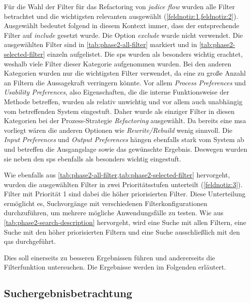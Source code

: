 

Für die Wahl der Filter für das Refactoring von \emph{jadice flow} wurden alle Filter betrachtet und die wichtigsten relevanten ausgewählt (\cref{feldnotiz:1,feldnotiz:2}).
Ausgewählt bedeutet folgend in diesem Kontext immer, dass der entsprechende Filter auf \emph{include} gesetzt wurde.
Die Option \emph{exclude} wurde nicht verwendet.
Die ausgewählten Filter sind in \cref{tab:phase2-all-filter} markiert und in \cref{tab:phase2-selected-filter} einzeln aufgelistet.
Die \glspl{sp} wurden als besonders wichtig erachtet, weshalb viele Filter dieser Kategorie aufgenommen wurden.
Bei den anderen Kategorien wurden nur die wichtigsten Filter verwendet, da eine zu große Anzahl an Filtern die Aussagekraft verringern könnte.
Vor allem \emph{Process Preferences} und \emph{Usability Preferences}, also Eigenschaften, die die interne Funktionsweise der Methode betreffen, wurden als relativ unwichtig und vor allem auch unabhängig vom betreffenden System eingestuft.
Daher wurde als einziger Filter in diesen Kategorien bei der Prozess-Strategie \emph{Refactoring} ausgewählt.
Da bereits eine \gls{msa} vorliegt wären die anderen Optionen wie \emph{Rewrite/Rebuild} wenig sinnvoll.
Die \emph{Input Preferences} und \emph{Output Preferences} hängen ebenfalls stark vom System ab und betreffen die Ausgangslage sowie das gewünschte Ergebnis.
Deswegen wurden sie neben den \glspl{sp} ebenfalls als besonders wichtig eingestuft. 



Wie ebenfalls aus \cref{tab:phase2-all-filter,tab:phase2-selected-filter} hervorgeht, wurden die ausgewählten Filter in zwei Prioritätsstufen unterteilt (\cref{feldnotiz:3}).
Filter mit Priorität 1 sind dabei die höher priorisierten Filter.
Diese Unterteilung ermöglicht es, Suchvorgänge mit verschiedenen Filterkonfigurationen durchzuführen, um mehrere mögliche Anwendungsfälle zu testen.
Wie aus \cref{tab:phase2-search-description} hervorgeht, wird eine Suche mit allen Filtern, eine Suche mit den höher priorisierten Filtern und eine Suche ausschließlich mit den \glspl{qa} durchgeführt.

Dies soll einerseits zu besseren Ergebnissen führen und andererseits die Filterfunktion untersuchen. 
Die Ergebnisse werden im Folgenden erläutert.

\subsection{Suchergebnisbetrachtung}
\label{sec:phase2-ergebnisdurchsicht}

